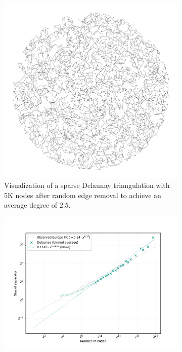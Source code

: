 \begin{figure}[tbhp]
	\centering
	\begin{subfigure}{0.35\linewidth}
		\centering
		\includegraphics[width=\linewidth]{graphics/delaunay_avg_deg.png}
		\caption{Visualization of a sparse Delaunay triangulation with 5K nodes after random edge removal to achieve an average degree of \(2.5\).}
		\label{fig:sparse_delaunay_viz}
	\end{subfigure}
	\hfill
	\begin{subfigure}{0.55\linewidth}
		\centering
		\includegraphics[width=\linewidth]{graphics/sep_delaunay_avg_deg.png}

\end{subfigure}
\end{figure}
